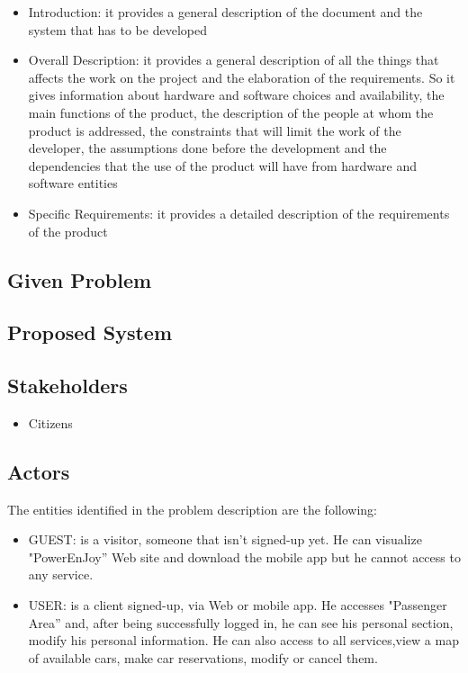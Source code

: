 \begin{itemize}
	\item Introduction: it provides a general description of the document and the system that has to be developed
	\item Overall Description: it provides a general description of all the things that  affects the work on the project and the elaboration of the requirements. So it gives information about hardware and software choices and availability, the main functions of the product, the description of the people at whom the product is addressed, the constraints that will limit the work of the developer, the assumptions done before the development and the dependencies that the use of the product will have from hardware and software entities
	\item Specific Requirements: it provides a detailed description of the requirements of the product
\end{itemize}


\subsection{Given Problem}

\subsection{Proposed System}


\subsection{Stakeholders}
\begin{itemize}
	\item Citizens
\end{itemize}



\subsection{Actors}
The entities identified in the problem description are the following: 
\begin{itemize}
	\item GUEST: is a visitor, someone that isn't signed-up yet. He can visualize
	"PowerEnJoy'' Web site and download the mobile app but he cannot
	access to any service.
	\item USER: is a client signed-up, via Web or mobile app. He accesses
	"Passenger Area'' and, after being successfully logged in, he can see
	his personal section, modify his personal information. He can also
	access to all services,view a map of available cars, make car reservations, modify or
	cancel them.
\end{itemize}

